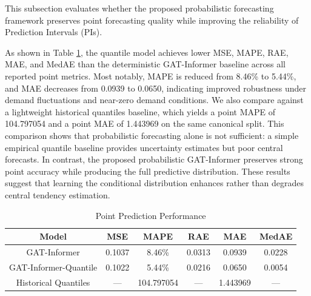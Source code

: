 \documentclass[conference]{IEEEtran}
\begin{document}
This subsection evaluates whether the proposed probabilistic forecasting framework preserves point forecasting quality while improving the reliability of Prediction Intervals (PIs).

As shown in Table \ref{tab: point_performance}, the quantile model achieves lower MSE, MAPE, RAE, MAE, and MedAE than the deterministic GAT-Informer baseline across all reported point metrics. Most notably, MAPE is reduced from 8.46\% to 5.44\%, and MAE decreases from 0.0939 to 0.0650, indicating improved robustness under demand fluctuations and near-zero demand conditions. We also compare against a lightweight historical quantiles baseline, which yields a point MAPE of 104.797054 and a point MAE of 1.443969 on the same canonical split. This comparison shows that probabilistic forecasting alone is not sufficient: a simple empirical quantile baseline provides uncertainty estimates but poor central forecasts. In contrast, the proposed probabilistic GAT-Informer preserves strong point accuracy while producing the full predictive distribution. These results suggest that learning the conditional distribution enhances rather than degrades central tendency estimation.


\begin{table}[htbp]
\caption{Point Prediction Performance}
\vspace{-1.5em}
\begin{center}
\begin{tabular}{|c|c|c|c|c|c|}
\hline
\textbf{Model} & \textbf{MSE} & \textbf{MAPE} & \textbf{RAE} & \textbf{MAE} & \textbf{MedAE} \\
\hline
GAT-Informer & 0.1037 & 8.46\% & 0.0313 & 0.0939 & 0.0228 \\
\hline
GAT-Informer-Quantile & 0.1022 & 5.44\% & 0.0216 & 0.0650 & 0.0054 \\
\hline
Historical Quantiles & --- & 104.797054 & --- & 1.443969 & --- \\
\hline
\end{tabular}
\label{tab: point_performance}
\end{center}
\end{table}
\vspace{-4mm}


\end{document}
